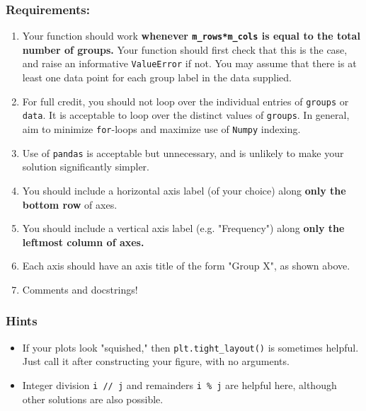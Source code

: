 \documentclass[11pt]{article}
\providecommand{\tightlist}{%
      \setlength{\itemsep}{0pt}\setlength{\parskip}{0pt}}
\begin{document}
\subsubsection{Requirements:}\label{requirements}

\begin{enumerate}
\def\labelenumi{\arabic{enumi}.}
\tightlist
\item
  Your function should work \textbf{whenever \texttt{m\_rows*m\_cols} is
  equal to the total number of groups.} Your function should first check
  that this is the case, and raise an informative \texttt{ValueError} if
  not. You may assume that there is at least one data point for each
  group label in the data supplied.
\item
  For full credit, you should not loop over the individual entries of
  \texttt{groups} or \texttt{data}. It is acceptable to loop over the
  distinct values of \texttt{groups}. In general, aim to minimize
  \texttt{for}-loops and maximize use of \texttt{Numpy} indexing.
\item
  Use of \texttt{pandas} is acceptable but unnecessary, and is unlikely
  to make your solution significantly simpler.
\item
  You should include a horizontal axis label (of your choice) along
  \textbf{only the bottom row} of axes.
\item
  You should include a vertical axis label (e.g. "Frequency") along
  \textbf{only the leftmost column of axes.}
\item
  Each axis should have an axis title of the form "Group X", as shown
  above.
\item
  Comments and docstrings!
\end{enumerate}

\subsubsection{Hints}\label{hints}

\begin{itemize}
\tightlist
\item
  If your plots look "squished," then \texttt{plt.tight\_layout()} is
  sometimes helpful. Just call it after constructing your figure, with
  no arguments.
\item
  Integer division \texttt{i\ //\ j} and remainders \texttt{i\ \%\ j}
  are helpful here, although other solutions are also possible.
\end{itemize}
\end{document}
